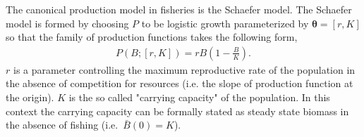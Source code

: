 \documentclass[12pt]{article}
\begin{document}
{%

%

%
The canonical production model in fisheries is the Schaefer model. The 
Schaefer model is formed by choosing $P$ to be logistic growth  %
parameterized by $\bm{\theta} = [r, K]$ so that the family of production 
functions takes the following form,  
%
\begin{align}
P(B; [r, K]) = r B \left(1-\frac{B}{K}\right). \label{logistic}
\end{align}
$r$ is a parameter controlling the maximum reproductive rate of the population 
in the absence of competition for resources (i.e. the slope of production 
function at the origin). $K$ is the so called "carrying capacity" of the 
population. In this context the carrying capacity can be formally stated as 
steady state biomass in the absence of fishing \mbox{(i.e. $\bar B(0)=K$).}  

}
\end{document}
